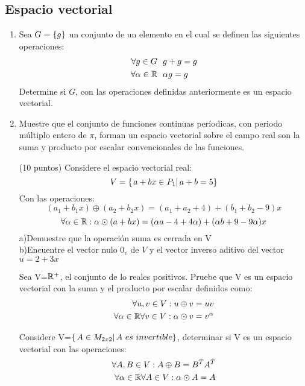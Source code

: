 \subsection{Espacio vectorial}
\begin{enumerate}[1.]
\item Sea $G= \left\{g \right\} $ un conjunto de un elemento en el cual se definen las siguientes operaciones:
\begin{align*}
\forall g \in G\ \  &g+g=g\\
\forall \alpha\in \mathbb{R}\ \ &\alpha g=g \\
\end{align*}
Determine si $G$, con las operaciones definidas anteriormente es un espacio vectorial.

\item Muestre que el conjunto de funciones continuas períodicas, con periodo múltiplo entero de $\pi$, forman un espacio vectorial sobre el campo real son la suma y producto por escalar convencionales de las funciones.


\begin{prob}
(10 puntos) Considere el espacio vectorial real:
\[V=\left\{ \left. a+bx \in P_1\right| a+b=5 \right\}\]
Con las operaciones:
 \[(a_1+b_1 x)\oplus(a_2+b_2 x)=(a_1+a_2+4)+(b_1+b_2-9)x\]
 \[ \forall \alpha \in \mathbb{R}:  \alpha\odot (a+b x)=(\alpha a-4+4\alpha)+(\alpha b+9-9\alpha)x\]
 a)Demuestre que la operaci\'on suma es cerrada en V~\\
 b)Encuentre el vector nulo $0_v$ de $V$ y el vector inverso aditivo del vector $u=2+3x$
\end{prob}

\begin{prob}
Sea V=$\mathbb{R}^+$, el conjunto de lo reales positivos. Pruebe que V es un espacio vectorial con la suma y el producto por escalar definidos como:
\begin{align*}
\forall u, v \in V: u\oplus v=uv\\
\forall \alpha \in \mathbb{R} \forall v \in V: \alpha\odot v =v^\alpha
\end{align*}
\end{prob}

\begin{prob}
Considere V=$\llaves{A\in M_{2x2}}{A\ es\ invertible}$, determinar si V es un espacio vectorial con las operaciones:
\begin{align*}
\forall A, B \in V: A\oplus B=B^T A^T\\
\forall \alpha \in \mathbb{R} \forall A \in V: \alpha\odot A =A
\end{align*}
\end{prob}



\end{enumerate}
